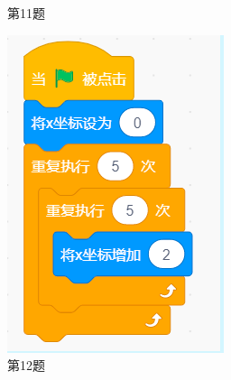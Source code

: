 \documentclass[10pt, a4paper]{article}
\begin{document}
\begin{enumerate}
\begin{figure}[htbp]
\begin{minipage}[t]{.22\textwidth}
                \caption*{第11题}
            \end{minipage}
            \begin{minipage}[t]{.13\textwidth}
                \centering
                \includegraphics[width=\textwidth]{12.png}
                \caption*{第12题}
            \end{minipage}
            \begin{minipage}[t]{.35\textwidth}
                \centering
                \begin{minipage}[t]{.4\textwidth}
                    \centering

\end{minipage}
\end{minipage}
\end{figure}
\end{enumerate}
\end{document}
